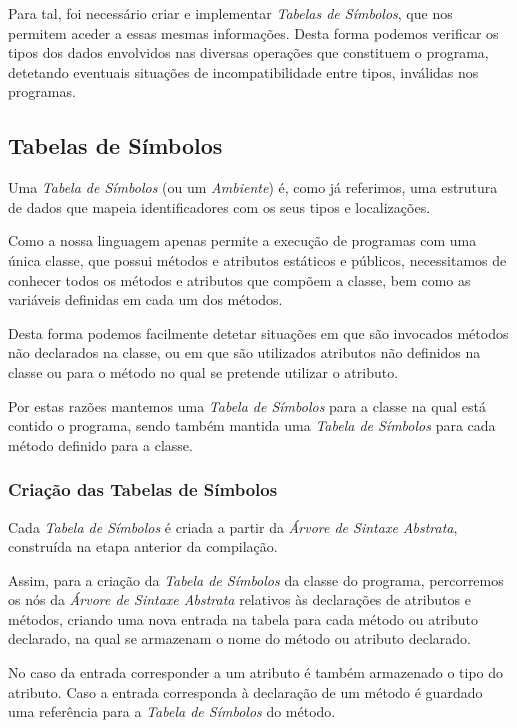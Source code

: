 \documentclass[11pt,a4paper]{article}
\begin{document}
	Para tal, foi necessário criar e implementar \emph{Tabelas de Símbolos}, que nos permitem aceder a essas mesmas informações. Desta forma podemos verificar os tipos dos dados envolvidos nas diversas operações que constituem o programa, detetando eventuais situações de incompatibilidade entre tipos, inválidas nos programas.

	\subsection{Tabelas de Símbolos}
	
	Uma \emph{Tabela de Símbolos} (ou um \emph{Ambiente}) é, como já referimos, uma estrutura de dados que mapeia identificadores com os seus tipos e localizações.
	
	Como a nossa linguagem apenas permite a execução de programas com uma única classe, que possui métodos e atributos estáticos e públicos, necessitamos de conhecer todos os métodos e atributos que compõem a classe, bem como as variáveis definidas em cada um dos métodos.
	
	Desta forma podemos facilmente detetar situações em que são invocados métodos não declarados na classe, ou em que são utilizados atributos não definidos na classe ou para o método no qual se pretende utilizar o atributo. 

	Por estas razões mantemos uma \emph{Tabela de Símbolos} para a classe na qual está contido o programa, sendo também mantida uma \emph{Tabela de Símbolos} para cada método definido para a classe.
	
	\subsubsection{Criação das Tabelas de Símbolos}
	
	Cada \emph{Tabela de Símbolos} é criada a partir da \emph{Árvore de Sintaxe Abstrata}, construída na etapa anterior da compilação.
	
	Assim, para a criação da \emph{Tabela de Símbolos} da classe do programa, percorremos os nós da \emph{Árvore de Sintaxe Abstrata} relativos às declarações de atributos e métodos, criando uma nova entrada na tabela para cada método ou atributo declarado, na qual se armazenam o nome do método ou atributo declarado.
	
	No caso da entrada corresponder a um atributo é também armazenado o tipo do atributo. Caso a entrada corresponda à declaração de um método é guardado uma referência para a \emph{Tabela de Símbolos} do método.
	
\end{document}

